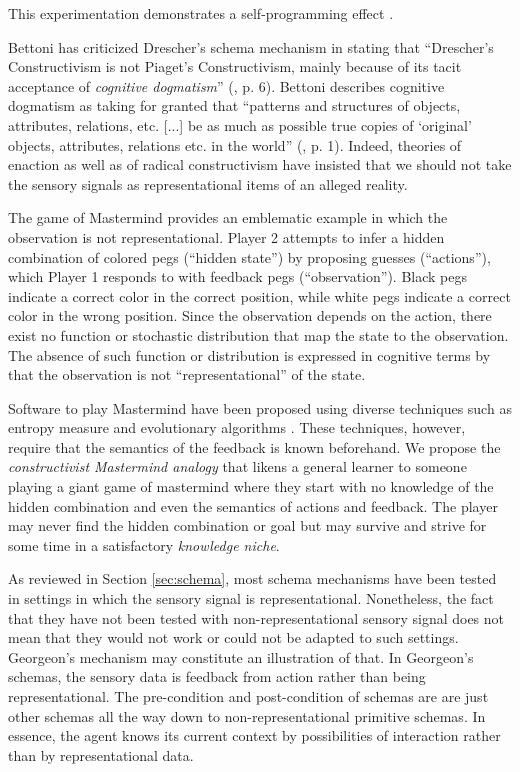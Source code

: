 \documentclass[runningheads]{llncs}
\begin{document}
This experimentation demonstrates a self-programming effect \cite{georgeon_cash_2019}.


Bettoni  has criticized Drescher's schema mechanism in stating that ``Drescher's Constructivism is not Piaget's Constructivism, mainly because of its tacit acceptance of \textit{cognitive dogmatism}'' (\cite{bettoni_made-up_1993}, p. 6).
Bettoni describes cognitive dogmatism as taking for granted that ``patterns and structures of objects, attributes, relations, etc. [...] be as much as possible true copies of `original' objects, attributes, relations etc. in the world'' (\cite{bettoni_made-up_1993}, p. 1).
Indeed, theories of enaction as well as of radical constructivism have insisted that we should not take the sensory signals as representational items of an alleged reality. 


The game of Mastermind provides an emblematic example in which the observation is not representational. 
Player 2 attempts to infer a hidden combination of colored pegs (``hidden state'') by proposing guesses (``actions''), which Player 1 responds to with feedback pegs (``observation''). Black pegs indicate a correct color in the correct position, while white pegs indicate a correct color in the wrong position.
Since the observation depends on the action, there exist no function or stochastic distribution that map the state to the observation. 
The absence of such function or distribution is expressed in cognitive terms by that the observation is not ``representational'' of the state.

Software to play Mastermind have been proposed using diverse techniques such as entropy measure and evolutionary algorithms \cite{cotta_entropy-driven_2010}.
These techniques, however, require that the semantics of the feedback is known beforehand. 
We propose the \textit{constructivist Mastermind analogy} that likens a general learner to someone playing a giant game of mastermind where they start with no knowledge of the hidden combination and even the semantics of actions and feedback.
The player may never find the hidden combination or goal but may survive and strive for some time in a satisfactory \textit{knowledge niche}.

As reviewed in Section \ref{sec:schema}, most schema mechanisms have been tested in settings in which the sensory signal is representational.
Nonetheless, the fact that they have not been tested with non-representational sensory signal does not mean that they would not work or could not be adapted to such settings. 
Georgeon's mechanism may constitute an illustration of that.  
In Georgeon's schemas, the sensory data is feedback from action rather than being representational. 
The pre-condition and post-condition of schemas are are just other schemas all the way down to non-representational primitive schemas. 
In essence, the agent knows its current context by possibilities of interaction rather than by representational data. 
\end{document}
